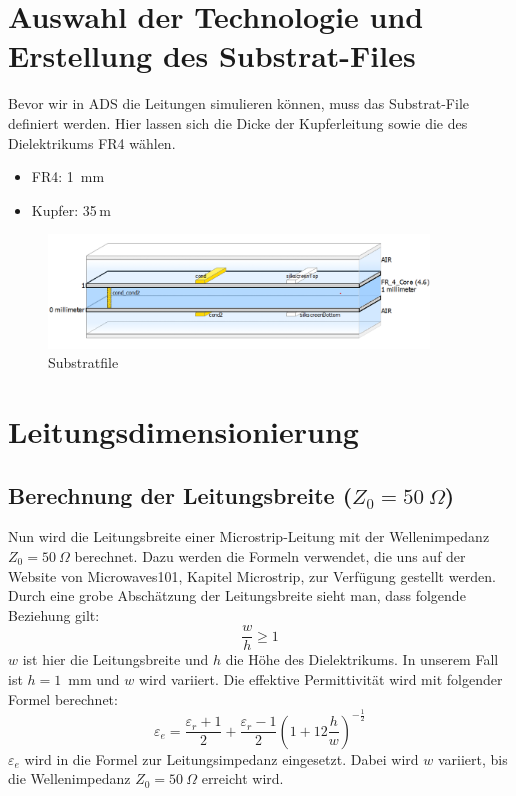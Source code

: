 \section{Auswahl der Technologie und Erstellung des Substrat-Files}
Bevor wir in ADS die Leitungen simulieren können, muss das Substrat-File definiert werden.
Hier lassen sich die Dicke der Kupferleitung sowie die des Dielektrikums FR4 wählen.
\begin{itemize}
    \item FR4: 1~mm
    \item Kupfer: 35\,\textmu m
\end{itemize}
\begin{figure}[H]
    \centering
    \includegraphics[width=0.9\textwidth]{Pictures/substratFile.png}
    \caption{Substratfile}
\end{figure}

\section{Leitungsdimensionierung}
\subsection{\texorpdfstring{Berechnung der Leitungsbreite ($Z_0 = 50~\Omega$)}{Berechnung der Leitungsbreite (Z0 = 50 Ohm)}}
Nun wird die Leitungsbreite einer Microstrip-Leitung mit der Wellenimpedanz $Z_0 = 50~\Omega$ berechnet.
Dazu werden die Formeln verwendet, die uns auf der Website von Microwaves101, Kapitel Microstrip, zur
Verfügung gestellt werden. Durch eine grobe Abschätzung der Leitungsbreite sieht man, dass folgende Beziehung gilt: \\
\[
\frac{w}{h} \geq 1
\]
$w$ ist hier die Leitungsbreite und $h$ die Höhe des Dielektrikums. In unserem Fall ist $h = 1$~mm und $w$ wird variiert. Die 
effektive Permittivität wird mit folgender Formel berechnet:
\begin{equation}
\varepsilon_e = \frac{\varepsilon_r + 1}{2} + \frac{\varepsilon_r - 1}{2} \left( 1 + 12 \frac{h}{w} \right)^{-\frac{1}{2}}
\end{equation}
$\varepsilon_e$ wird in die Formel zur Leitungsimpedanz eingesetzt. Dabei wird $w$
variiert, bis die Wellenimpedanz $Z_0 = 50~\Omega$ erreicht wird.

